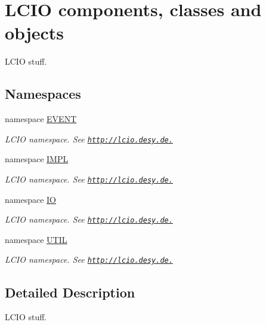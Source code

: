 \hypertarget{group___l_c_i_o}{
\section{LCIO components, classes and objects}
\label{group___l_c_i_o}
}


LCIO stuff.  
\subsection*{Namespaces}
\begin{DoxyCompactItemize}
\item 
namespace \hyperlink{namespace_e_v_e_n_t}{EVENT}


\begin{DoxyCompactList}\small\item\em LCIO namespace. See \href{http://lcio.desy.de.}{\tt http://lcio.desy.de.} \item\end{DoxyCompactList}\item 
namespace \hyperlink{namespace_i_m_p_l}{IMPL}


\begin{DoxyCompactList}\small\item\em LCIO namespace. See \href{http://lcio.desy.de.}{\tt http://lcio.desy.de.} \item\end{DoxyCompactList}\item 
namespace \hyperlink{namespace_i_o}{IO}


\begin{DoxyCompactList}\small\item\em LCIO namespace. See \href{http://lcio.desy.de.}{\tt http://lcio.desy.de.} \item\end{DoxyCompactList}\item 
namespace \hyperlink{namespace_u_t_i_l}{UTIL}


\begin{DoxyCompactList}\small\item\em LCIO namespace. See \href{http://lcio.desy.de.}{\tt http://lcio.desy.de.} \item\end{DoxyCompactList}\end{DoxyCompactItemize}


\subsection{Detailed Description}
LCIO stuff. 